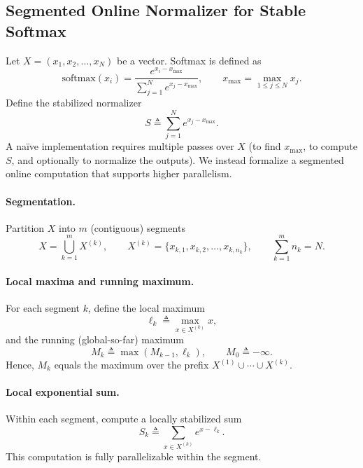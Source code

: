 \subsection{Segmented Online Normalizer for Stable Softmax}

Let $X = (x_1, x_2, \dots, x_N)$ be a vector. Softmax is defined as
\begin{equation}
\mathrm{softmax}(x_i) = \frac{e^{x_i - x_{\max}}}{\sum_{j=1}^{N} e^{x_j - x_{\max}}},
\qquad
x_{\max} = \max_{1 \le j \le N} x_j .
\end{equation}
Define the stabilized normalizer
\begin{equation}
S \triangleq \sum_{j=1}^{N} e^{x_j - x_{\max}}.
\end{equation}
A naïve implementation requires multiple passes over $X$ (to find $x_{\max}$, to compute $S$, and optionally to normalize the outputs). We instead formalize a segmented online computation that supports higher parallelism.

\paragraph{Segmentation.}
Partition $X$ into $m$ (contiguous) segments
\begin{equation}
X = \bigcup_{k=1}^{m} X^{(k)}, 
\qquad 
X^{(k)} = \{x_{k,1}, x_{k,2}, \dots, x_{k,n_k}\},
\qquad
\sum_{k=1}^{m} n_k = N .
\end{equation}

\paragraph{Local maxima and running maximum.}
For each segment $k$, define the local maximum
\begin{equation}
\ell_k \triangleq \max_{x \in X^{(k)}} x,
\end{equation}
and the running (global-so-far) maximum
\begin{equation}
M_k \triangleq \max(M_{k-1}, \ell_k),
\qquad
M_0 \triangleq -\infty .
\end{equation}
Hence, $M_k$ equals the maximum over the prefix $X^{(1)} \cup \cdots \cup X^{(k)}$.

\paragraph{Local exponential sum.}
Within each segment, compute a locally stabilized sum
\begin{equation}
S_k \triangleq \sum_{x \in X^{(k)}} e^{x - \ell_k}.
\end{equation}
This computation is fully parallelizable within the segment.


